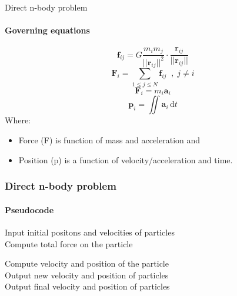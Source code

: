 \documentclass{beamer}
\begin{document}
\begin{frame}{Direct n-body problem}
  \framesubtitle{Governing equations}
	\begin{equation*}
	\textbf{f}_{ij} = G \frac{m_i m_j}{||\textbf{r}_{ij}||^2} \cdot \frac{\textbf{r}_{ij}}{||\textbf{r}_{ij}||}
	\end{equation*}
	\begin{equation*}
	\textbf{F}_i = \sum_{1 \le j \le N} \textbf{f}_{ij} \;\; ,\; j \ne i
	\end{equation*}
	\begin{equation*}
	\textbf{F}_i = m_i \textbf{a}_i
	\end{equation*}
	\begin{equation*}
	\textbf{p}_i = \iint \textbf{a}_i\,\textrm{d}t
	\end{equation*}
Where:
	\begin{itemize}
	 	\item Force (F) is function of mass and acceleration and
	 	\item Position (p) is a function of velocity/acceleration and time.
	\end{itemize}	 	
	
\end{frame}


\begin{frame}[fragile]
\frametitle{Direct n-body problem}
  \framesubtitle{Pseudocode}
	\begin{algorithm}[H]
	\begin{algorithmic}[1]


\STATE Input initial positons and velocities of particles
	\\
		\STATE Compute total force on the particle \\
	\ENDFOR
	
		\STATE Compute velocity and position of the particle\\
	\ENDFOR	
\STATE  Output new velocity and position of particles\\
\ENDWHILE
\STATE  Output final velocity and position of particles\\

\end{algorithmic}
\label{alg:seq}
\end{algorithm}
\end{frame}
\end{document}
